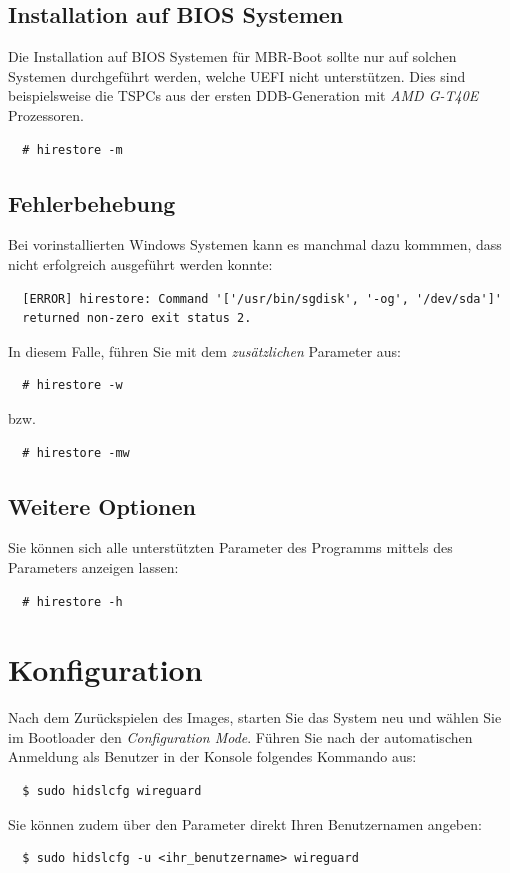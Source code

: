 \documentclass[a4paper,11pt,authoryear]{article}
\begin{document}
\subsection{Installation auf BIOS Systemen}
Die Installation auf BIOS Systemen für MBR-Boot sollte nur auf solchen Systemen durchgeführt werden, welche UEFI nicht unterstützen.
Dies sind beispielsweise die TSPCs aus der ersten DDB-Generation mit \emph{AMD G-T40E} Prozessoren.
\begin{verbatim}
  # hirestore -m
\end{verbatim}
\subsection{Fehlerbehebung}
Bei vorinstallierten Windows Systemen kann es manchmal dazu kommmen, dass  nicht erfolgreich ausgeführt werden konnte:
\begin{verbatim}
  [ERROR] hirestore: Command '['/usr/bin/sgdisk', '-og', '/dev/sda']' 
  returned non-zero exit status 2.
\end{verbatim}
In diesem Falle, führen Sie  mit dem \emph{zusätzlichen} Parameter  aus:
\begin{verbatim}
  # hirestore -w
\end{verbatim}
bzw.
\begin{verbatim}
  # hirestore -mw
\end{verbatim}
\subsection{Weitere Optionen}
Sie können sich alle unterstützten Parameter des Programms  mittels des Parameters  anzeigen lassen:
\begin{verbatim}
  # hirestore -h
\end{verbatim}

\section{Konfiguration}
Nach dem Zurückspielen des Images, starten Sie das System neu und wählen Sie im Bootloader den \emph{Configuration Mode}.
Führen Sie nach der automatischen Anmeldung als Benutzer  in der Konsole folgendes Kommando aus:
\begin{verbatim}
  $ sudo hidslcfg wireguard
\end{verbatim}
Sie können zudem über den Parameter  direkt Ihren Benutzernamen angeben:
\begin{verbatim}
  $ sudo hidslcfg -u <ihr_benutzername> wireguard
\end{verbatim}
\end{document}
